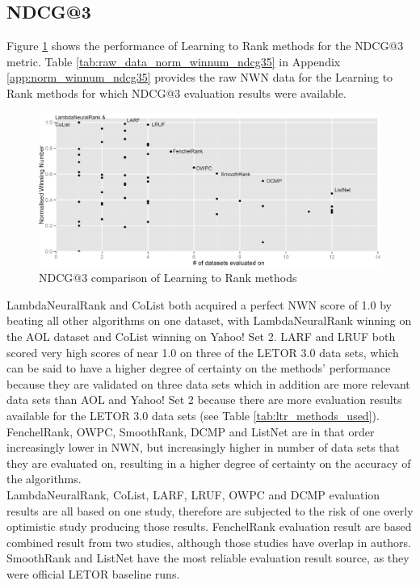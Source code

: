 \subsection{NDCG@3}
Figure \ref{fig:normalised_winning_number_NDCG3} shows the performance of Learning to Rank methods for the \ac{NDCG}@3 metric. Table \ref{tab:raw_data_norm_winnum_ndcg35} in Appendix \ref{app:norm_winnum_ndcg35} provides the raw \ac{NWN} data for the Learning to Rank methods for which \ac{NDCG}@3 evaluation results were available.\\

\begin{figure}[!h]
\centering
\includegraphics[scale=0.32]{gfx/ndcg3_winnum}
\caption{\acs{NDCG}@3 comparison of Learning to Rank methods}
\label{fig:normalised_winning_number_NDCG3}
\end{figure}

LambdaNeuralRank and CoList both acquired a perfect \ac{NWN} score of 1.0 by beating all other algorithms on one dataset, with LambdaNeuralRank winning on the AOL dataset and CoList winning on Yahoo! Set 2. LARF and LRUF both scored very high scores of near 1.0 on three of the LETOR 3.0 data sets, which can be said to have a higher degree of certainty on the methods' performance because they are validated on three data sets which in addition are more relevant data sets than AOL and Yahoo! Set 2 because there are more evaluation results available for the LETOR 3.0 data sets (see Table \ref{tab:ltr_methods_used}). FenchelRank, OWPC, SmoothRank, DCMP and ListNet are in that order increasingly lower in \ac{NWN}, but increasingly higher in number of data sets that they are evaluated on, resulting in a higher degree of certainty on the accuracy of the algorithms.\\

LambdaNeuralRank, CoList, LARF, LRUF, OWPC and DCMP evaluation results are all based on one study, therefore are subjected to the risk of one overly optimistic study producing those results. FenchelRank evaluation result are based combined result from two studies, although those studies have overlap in authors. SmoothRank and ListNet have the most reliable evaluation result source, as they were official LETOR baseline runs.  

